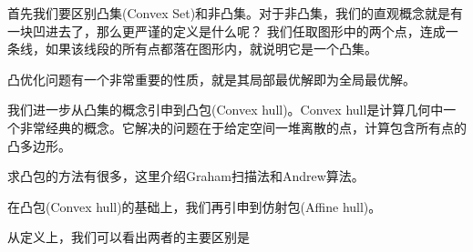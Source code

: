 首先我们要区别凸集(Convex Set)和非凸集。对于非凸集，我们的直观概念就是有一块凹进去了，那么更严谨的定义是什么呢？
我们任取图形中的两个点，连成一条线，如果该线段的所有点都落在图形内，就说明它是一个凸集。

凸优化问题有一个非常重要的性质，就是其局部最优解即为全局最优解。

我们进一步从凸集的概念引申到凸包(Convex hull)。Convex hull是计算几何中一个非常经典的概念。它解决的问题在于给定空间一堆离散的点，计算包含所有点的凸多边形。

求凸包的方法有很多，这里介绍Graham扫描法和Andrew算法。

在凸包(Convex hull)的基础上，我们再引申到仿射包(Affine hull)。

从定义上，我们可以看出两者的主要区别是
